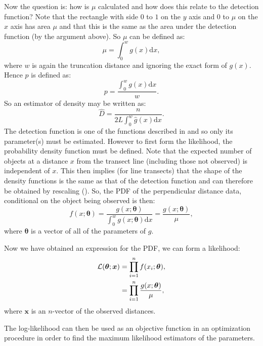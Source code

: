 Now the question is: how is $\mu$ calculated and how does this relate to the detection function? Note that the rectangle with side $0$ to $1$ on the $y$ axis and $0$ to $\mu$ on the $x$ axis has area $\mu$ and that this is the same as the area under the detection function (by the argument above). So $\mu$ can be defined as:
\begin{equation}
\mu = \int_0^w g(x) \text{d}x,
\label{ds-lt-mu-def}
\end{equation}
where $w$ is again the truncation distance and ignoring the exact form of $g(x)$. Hence $p$ is defined as:
\begin{equation*}
p = \frac{\int_0^w g(x) \text{d}x}{w}.
\end{equation*}
So an estimator of density may be written as:
\begin{equation*}
\hat{D}=\frac{n}{2L \int_0^w \hat{g}(x) \text{d}x}.
\end{equation*}
The detection function is one of the functions described in  and so only its parameter(s) must be estimated. However to first form the likelihood, the probability density function must be defined. Note that the expected number of objects at a distance $x$ from the transect line (including those not observed) is independent of $x$. This then implies (for line transects) that the shape of the density functions is the same as that of the detection function and can therefore be obtained by rescaling (\cite[p. 38]{IDS}). So, the PDF of the perpendicular distance data, conditional on the object being observed is then:
\begin{equation*}
f(x;\bm{\theta}) = \frac{g(x;\bm{\theta})}{\int_0^w g(x;\bm{\theta}) \text{d}x} = \frac{g(x;\bm{\theta})}{\mu},
\end{equation*}
where $\bm{\theta}$ is a vector of all of the parameters of $g$.

Now we have obtained an expression for the PDF, we can form a likelihood:
\begin{align}
\mathcal{L}(\bm{\theta}; \bm{x}) &= \prod_{i=1}^n f(x_i;\bm{\theta}),\notag \\
&= \prod_{i=1}^n \frac{g(x;\bm{\theta})}{\mu},
\label{ds-lt-likelihood}
\end{align}
where $\bm{x}$ is an $n$-vector of the observed distances.

The log-likelihood can then be used as an objective function in an optimization procedure in order to find the maximum likelihood estimators of the parameters.


